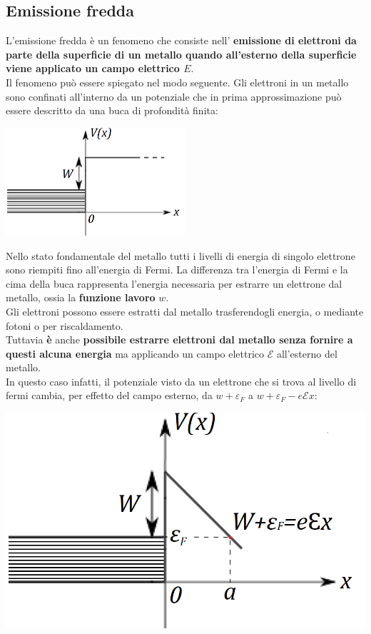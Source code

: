 \subsection{Emissione fredda}
L'emissione fredda è un fenomeno che consiste nell' \textbf{emissione di elettroni da parte della superficie di un metallo quando all'esterno della superficie viene applicato un campo elettrico $E$}.\\
Il fenomeno può essere spiegato nel modo seguente. Gli elettroni in un metallo sono confinati all'interno da un potenziale che in prima approssimazione può essere descritto da una buca di profondità finita:
\begin{center}
\includegraphics[width=0.5\textwidth]{immagini/cap_10/fig_10_9}
\end{center}
Nello stato fondamentale del metallo tutti i livelli di energia di singolo elettrone sono riempiti fino all'energia di Fermi. La differenza tra l'energia di Fermi e la cima della buca rappresenta l'energia necessaria per estrarre un elettrone dal metallo, ossia la \textbf{funzione lavoro} $w$.\\
Gli elettroni possono essere estratti dal metallo trasferendogli energia, o mediante fotoni o per riscaldamento.\\
Tuttavia \textbf{è} anche \textbf{possibile estrarre elettroni dal metallo senza fornire a questi alcuna energia} ma applicando un campo elettrico $\mathscr{E}$ all'esterno del metallo.\\
In questo caso infatti, il potenziale visto da un elettrone che si trova al livello di fermi cambia, per effetto del campo esterno, da $w+\varepsilon _F$ a $w+\varepsilon _F-e\mathscr{E}x$:
\vspace{.5cm}
\begin{minipage}{.5\textwidth}
\includegraphics[width=.75\textwidth]{immagini/cap_10/fig_10_10.png}
\end{minipage}
